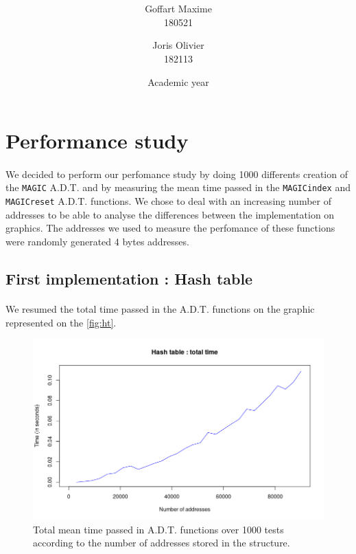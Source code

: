\documentclass[a4paper, 11pt, oneside]{article}
\title{\ClassName\\\vspace*{0.8cm}\ProjectName\vspace{0.8cm}}
\author{Goffart Maxime \\180521 \and Joris Olivier \\ 182113}
\date{\vspace{1cm}Academic year \AcademicYear}
\begin{document}
\begin{titlingpage}
{\let\newpage\relax\maketitle}
\end{titlingpage}

\section{Performance study}
\paragraph{}We decided to perform our perfomance study by doing 1000 differents creation of the \texttt{MAGIC} A.D.T. and by measuring the mean time passed in the \texttt{MAGICindex} and \texttt{MAGICreset} A.D.T. functions. We chose to deal with an increasing number of addresses to be able to analyse the differences between the implementation on graphics. The addresses we used to measure the perfomance of these functions were randomly generated 4 bytes addresses.
\subsection{First implementation : Hash table}
\paragraph{}We resumed the total time passed in the A.D.T. functions on the graphic represented on the \autoref{fig:ht}. 
\begin{figure}[H]
  \centering
  \includegraphics[scale=0.6]{plots/ht_total.png} 
  \caption{Total mean time passed in A.D.T. functions over 1000 tests according to the number of addresses stored in the structure.}\label{fig:ht}
\end{figure}
\end{document}

